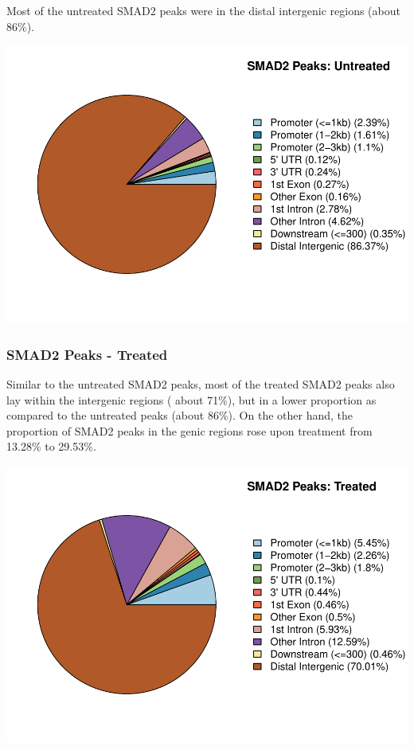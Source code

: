 \documentclass[]{article}
\begin{document}
Most of the untreated SMAD2 peaks were in the distal intergenic regions
(about 86\%).

\includegraphics{Bioinfo_Analysis_files/figure-latex/unnamed-chunk-5-1.pdf}

\hypertarget{smad2-peaks---treated}{%
\subsubsection{SMAD2 Peaks - Treated}\label{smad2-peaks---treated}}

Similar to the untreated SMAD2 peaks, most of the treated SMAD2 peaks
also lay within the intergenic regions ( about 71\%), but in a lower
proportion as compared to the untreated peaks (about 86\%). On the other
hand, the proportion of SMAD2 peaks in the genic regions rose upon
treatment from 13.28\% to 29.53\%.

\includegraphics{Bioinfo_Analysis_files/figure-latex/unnamed-chunk-6-1.pdf}
\end{document}
